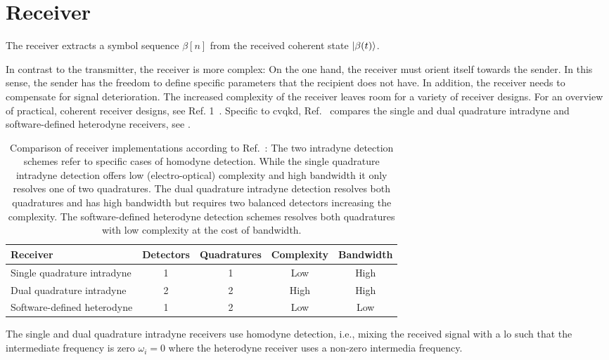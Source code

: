\FloatBarrier
\section{Receiver}

The receiver extracts a symbol sequence $\beta[n]$ from the received coherent state $\ket{\beta(t)}$.

In contrast to the transmitter, the receiver is more complex:
On the one hand, the receiver must orient itself towards the sender.
In this sense, the sender has the freedom to define specific parameters that the recipient does not have.
In addition, the receiver needs to compensate for signal deterioration.
The increased complexity of the receiver leaves room for a variety of receiver designs.
For an overview of practical, coherent receiver designs, see Ref. 1~\cite{Kikuchi2016}.
Specific to \gls{cvqkd}, Ref.~\cite{Brunner2017} compares the single and dual quadrature intradyne and software-defined heterodyne receivers, see .
\begin{table}[htb]
  \centering
  \begin{tabular}{lcccc}
    \toprule
      Receiver & Detectors & Quadratures & Complexity & Bandwidth \\
    \midrule
      Single quadrature intradyne & \num{1} & \num{1} & Low & High \\
      Dual quadrature intradyne & \num{2} & \num{2} & High & High \\
      Software-defined heterodyne & \num{1} & \num{2} & Low & Low \\
    \bottomrule
  \end{tabular}
  \caption{Comparison of receiver implementations according to Ref.~\cite{Brunner2017}: The two intradyne detection schemes refer to specific cases of homodyne detection. While the single quadrature intradyne detection offers low (electro-optical) complexity and high bandwidth it only resolves one of two quadratures. The dual quadrature intradyne detection resolves both quadratures and has high bandwidth but requires two balanced detectors increasing the complexity. The software-defined heterodyne detection schemes resolves both quadratures with low complexity at the cost of bandwidth.}\label{tab:receivers}
\end{table}
The single and dual quadrature intradyne receivers use homodyne detection, i.e., mixing the received signal with a \gls{lo} such that the intermediate frequency is zero $\omega_i=0$ where the heterodyne receiver uses a non-zero intermedia frequency.
